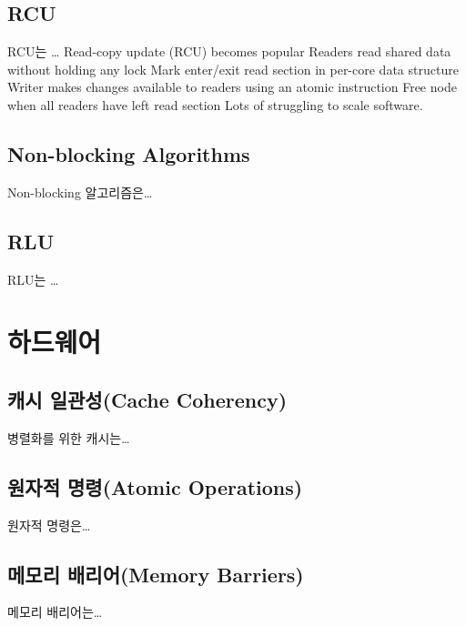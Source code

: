 \subsection{RCU}

RCU는 \ldots
Read-copy update (RCU) becomes popular
Readers read shared data without holding any lock
Mark enter/exit read section in per-core data structure
Writer makes changes available to readers using an atomic
instruction
Free node when all readers have left read section
Lots of struggling to scale software.

\subsection{Non-blocking Algorithms}

Non-blocking 알고리즘은\ldots

\subsection{RLU}

RLU는 \ldots


\newpage
\section{하드웨어}
\label{sec:hwrelated}

\subsection{캐시 일관성(Cache Coherency)}

병렬화를 위한 캐시는\ldots 

\subsection{원자적 명령(Atomic Operations)}

원자적 명령은\ldots

\subsection{메모리 배리어(Memory Barriers)}

메모리 배리어는\ldots

